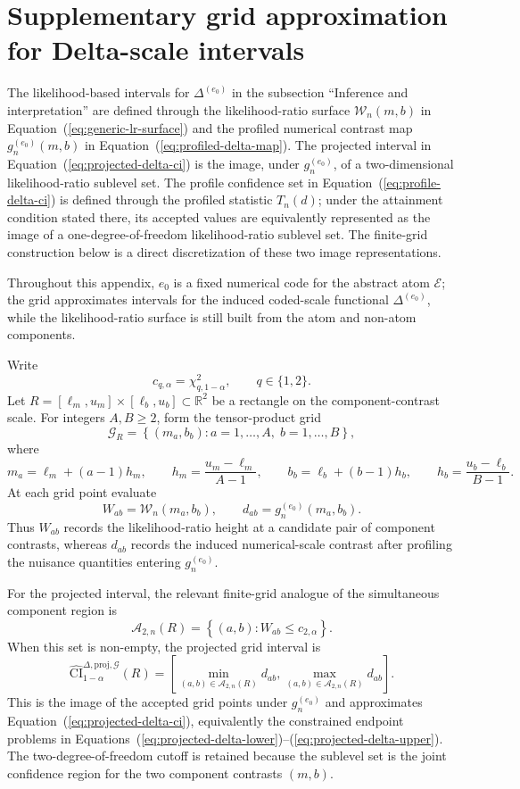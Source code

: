 \documentclass[11pt]{article}
\begin{document}
\section{Supplementary grid approximation for Delta-scale intervals}
\label{app:supplementary-delta-intervals}

The likelihood-based intervals for $\Delta^{(e_0)}$ in the subsection ``Inference and interpretation'' are defined through the likelihood-ratio surface $\mathcal{W}_n(m,b)$ in Equation~(\ref{eq:generic-lr-surface}) and the profiled numerical contrast map $g_n^{(e_0)}(m,b)$ in Equation~(\ref{eq:profiled-delta-map}). The projected interval in Equation~(\ref{eq:projected-delta-ci}) is the image, under $g_n^{(e_0)}$, of a two-dimensional likelihood-ratio sublevel set. The profile confidence set in Equation~(\ref{eq:profile-delta-ci}) is defined through the profiled statistic $T_n(d)$; under the attainment condition stated there, its accepted values are equivalently represented as the image of a one-degree-of-freedom likelihood-ratio sublevel set. The finite-grid construction below is a direct discretization of these two image representations.

Throughout this appendix, $e_0$ is a fixed numerical code for the abstract atom $\mathcal E$; the grid approximates intervals for the induced coded-scale functional $\Delta^{(e_0)}$, while the likelihood-ratio surface is still built from the atom and non-atom components.

Write
\[
  c_{q,\alpha}=\chi^2_{q,1-\alpha},
  \qquad q\in\{1,2\}.
\]
Let $R=[\ell_m,u_m]\times[\ell_b,u_b]\subset\mathbb{R}^2$ be a rectangle on the component-contrast scale. For integers $A,B\geq2$, form the tensor-product grid
\[
  \mathcal{G}_{R}
  =
  \left\{
    (m_a,b_b):
    a=1,\ldots,A,\;
    b=1,\ldots,B
  \right\},
\]
where
\[
  m_a=\ell_m+(a-1)h_m,
  \qquad
  h_m=\frac{u_m-\ell_m}{A-1},
  \qquad
  b_b=\ell_b+(b-1)h_b,
  \qquad
  h_b=\frac{u_b-\ell_b}{B-1}.
\]
At each grid point evaluate
\[
  W_{ab}=\mathcal{W}_n(m_a,b_b),
  \qquad
  d_{ab}=g_n^{(e_0)}(m_a,b_b).
\]
Thus $W_{ab}$ records the likelihood-ratio height at a candidate pair of component contrasts, whereas $d_{ab}$ records the induced numerical-scale contrast after profiling the nuisance quantities entering $g_n^{(e_0)}$.

For the projected interval, the relevant finite-grid analogue of the simultaneous component region is
\[
  \mathcal{A}_{2,n}(R)
  =
  \left\{
    (a,b):
    W_{ab}\leq c_{2,\alpha}
  \right\}.
\]
When this set is non-empty, the projected grid interval is
\[
  \widehat{\mathrm{CI}}^{\Delta,\mathrm{proj},\mathcal{G}}_{1-\alpha}(R)
  =
  \left[
    \min_{(a,b)\in\mathcal{A}_{2,n}(R)} d_{ab},
    \max_{(a,b)\in\mathcal{A}_{2,n}(R)} d_{ab}
  \right].
\]
This is the image of the accepted grid points under $g_n^{(e_0)}$ and approximates Equation~(\ref{eq:projected-delta-ci}), equivalently the constrained endpoint problems in Equations~(\ref{eq:projected-delta-lower})--(\ref{eq:projected-delta-upper}). The two-degree-of-freedom cutoff is retained because the sublevel set is the joint confidence region for the two component contrasts $(m,b)$.
\end{document}
